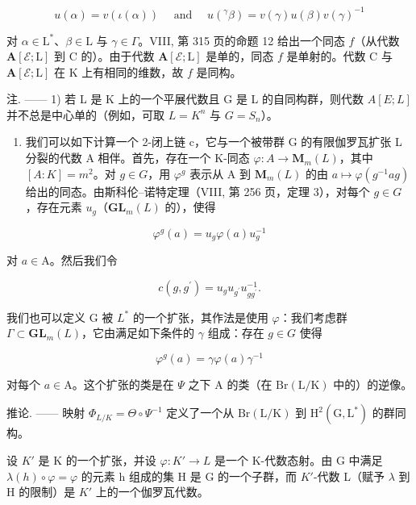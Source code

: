 \[
u (\alpha) = v (\iota (\alpha)) \quad \text { and } \quad u (^ {\gamma} \beta) = v (\gamma) u (\beta) v (\gamma) ^ {- 1}
\]

对 \(\alpha \in \mathrm{L}^*\)、\(\beta \in \mathrm{L}\) 与 \(\gamma \in \Gamma\)。VIII, 第 315 页的命题 12 给出一个同态 \(f\)（从代数 \(\mathbf{A}[\mathcal{E};\mathrm{L}]\) 到 \(\mathrm{C}\) 的）。由于代数 \(\mathbf{A}[\mathcal{E};\mathrm{L}]\) 是单的，同态 \(f\) 是单射的。代数 \(\mathrm{C}\) 与 \(\mathbf{A}[\mathcal{E};\mathrm{L}]\) 在 \(\mathrm{K}\) 上有相同的维数，故 \(f\) 是同构。

注. —— 1) 若 L 是 K 上的一个平展代数且 G 是 L 的自同构群，则代数 \(A[E;L]\) 并不总是中心单的（例如，可取 \(L = K^{n}\) 与 \(G = S_{n}\)）。

\begin{enumerate}
\def\labelenumi{\arabic{enumi})}
\setcounter{enumi}{1}
\tightlist
\item
  我们可以如下计算一个 2-闭上链 c，它与一个被带群 G 的有限伽罗瓦扩张 L 分裂的代数 A 相伴。首先，存在一个 K-同态 \(\varphi: A \to \mathbf{M}_{m}(L)\)，其中 \([A:K] = m^{2}\)。对 \(g \in G\)，用 \(\varphi^{g}\) 表示从 A 到 \(\mathbf{M}_{m}(L)\) 的由 \(a \mapsto \varphi(g^{-1}ag)\) 给出的同态。由斯科伦--诺特定理（VIII, 第 256 页，定理 3），对每个 \(g \in G\)，存在元素 \(u_{g}\)（\(\mathbf{GL}_{m}(L)\) 的），使得
\end{enumerate}

\[
\varphi^ {g} (a) = u _ {g} \varphi (a) u _ {g} ^ {- 1}
\]

对 \(a\in \mathrm{A}\)。然后我们令

\[
c (g, g ^ {\prime}) = u _ {g} u _ {g ^ {\prime}} u _ {g g ^ {\prime}} ^ {- 1}.
\]

我们也可以定义 G 被 \(L^{*}\) 的一个扩张，其作法是使用 \(\varphi\)：我们考虑群 \(\Gamma \subset \mathbf{GL}_{m}(L)\)，它由满足如下条件的 \(\gamma\) 组成：存在 \(g \in G\) 使得

\[
\varphi^ {g} (a) = \gamma \varphi (a) \gamma^ {- 1}
\]

对每个 \(a \in \mathrm{A}\)。这个扩张的类是在 \(\Psi\) 之下 \(\mathrm{A}\) 的类（在 \(\mathrm{Br}(\mathrm{L} / \mathrm{K})\) 中的）的逆像。

推论. —— 映射 \(\Phi_{L/K} = \Theta \circ \Psi^{-1}\) 定义了一个从 \(\mathrm{Br}(\mathrm{L}/\mathrm{K})\) 到 \(\mathrm{H}^{2}(\mathrm{G}, \mathrm{L}^{*})\) 的群同构。

设 \(K'\) 是 K 的一个扩张，并设 \(\varphi: K' \to L\) 是一个 K-代数态射。由 G 中满足 \(\lambda(h) \circ \varphi = \varphi\) 的元素 h 组成的集 H 是 G 的一个子群，而 \(K'\)-代数 L（赋予 \(\lambda\) 到 H 的限制）是 \(K'\) 上的一个伽罗瓦代数。

